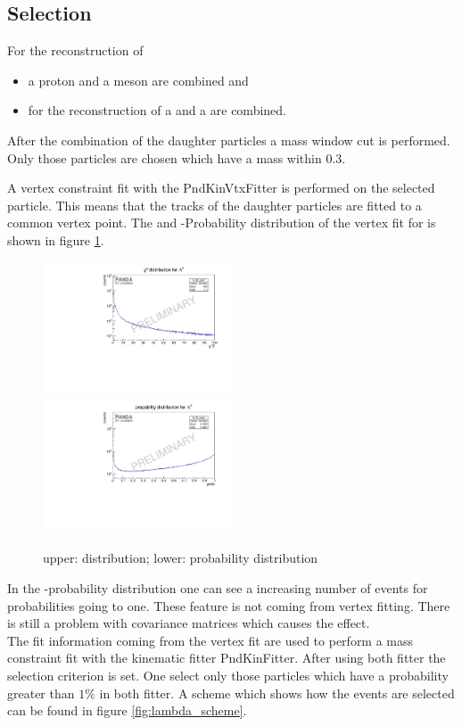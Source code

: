 	\subsection*{Selection}
		For the reconstruction of 
		
		\begin{itemize}
			\item \lam a proton and a \piminus meson are combined and
			\item for the reconstruction of \alam a \antiproton and a \piplus are combined.
		\end{itemize}
		 
		After the combination of the daughter particles a mass window cut is performed.
		Only those particles are chosen which have a mass within $0.3$\massunit.
		
		
		A vertex constraint fit with the PndKinVtxFitter is performed on the selected particle.
		This means that the tracks of the daughter particles are fitted to a common vertex point.  
		The \chisq and \chisq-Probability distribution of the vertex fit for \lam is shown in figure \ref{fig:lambda_chi2}.
		
		\begin{figure}
			\centering
				\includegraphics[width=0.50\textwidth]{./plots/lambda0/lambda0_chisqrt.pdf}
				\includegraphics [width=0.50\textwidth]{./plots/lambda0/lambda0_prob.pdf}
			\caption{\propose upper: \chisq distribution; lower: \chisq probability distribution}
			\label{fig:lambda_chi2}
		\end{figure}
		
		In the \chisq-probability distribution one can see a increasing number of events for probabilities going to one.
		These feature is not coming from vertex fitting.
		There is still a problem with covariance matrices which causes the effect.
		\vspace{11pt}\\
		The fit information coming from the vertex fit are used to perform a mass constraint fit with the kinematic fitter PndKinFitter.
		After using both fitter the selection criterion is set. 
		One select only those particles which have a probability greater than $1\%$ in both fitter.
		A scheme which shows how the events are selected can be found in figure \ref{fig:lambda_scheme}. 
		
